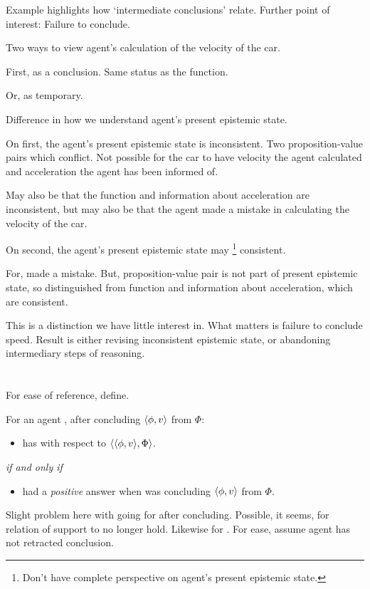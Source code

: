 \begin{note}
  Example highlights how `intermediate conclusions' relate.
  Further point of interest:
  Failure to conclude.

  Two ways to view agent's calculation of the velocity of the car.

  First, as a conclusion.
  Same status as the function.

  Or, as temporary.

  Difference in how we understand agent's present epistemic state.

  On first, the agent's present epistemic state is inconsistent.
  Two proposition-value pairs which conflict.
  Not possible for the car to have velocity the agent calculated and acceleration the agent has been informed of.

  May also be that the function and information about acceleration are inconsistent, but may also be that the agent made a mistake in calculating the velocity of the car.

  On second, the agent's present epistemic state may%
  \footnote{
    Don't have complete perspective on agent's present epistemic state.
  }
  consistent.

  For, made a mistake.
  But, proposition-value pair is not part of present epistemic state, so distinguished from function and information about acceleration, which are consistent.

  This is a distinction we have little interest in.
  What matters is failure to conclude speed.
  Result is either revising inconsistent epistemic state, or abandoning intermediary steps of reasoning.
\end{note}


\section{\zS{}}
\label{cha:zS:sec:zS}

\begin{note}
  For ease of reference, define.
  \begin{definition}[\izS{}]
    \label{idea:zS}
    For an agent \vAgent{}, after concluding \(\langle \phi, v \rangle\) from \(\Phi\):
    \begin{itemize}
    \item
      \vAgent{} has \zS{} with respect to \(\langle \langle \phi, v \rangle, \Phi \rangle\).
    \end{itemize}

    \emph{if and only if}

    \begin{itemize}
    \item
      \qzS{} had a \emph{positive} answer when \vAgent{} was concluding \(\langle \phi, v \rangle\) from \(\Phi\).
    \end{itemize}
  \end{definition}

  Slight problem here with going for after concluding.
  Possible, it seems, for relation of support to no longer hold.
  Likewise for \zS{}.
  For ease, assume agent has not retracted conclusion.
\end{note}

